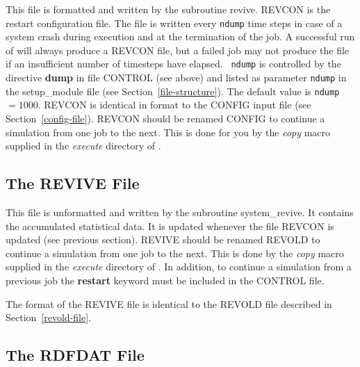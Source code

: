 This file is formatted and written by the subroutine {\sc revive}.
REVCON is the restart configuration file.  The file is written every
{\tt ndump} time steps in case of a system crash during execution
and at the termination of the job.  A successful run of \D will
always produce a REVCON file, but a failed job may not produce the
file if an insufficient number of timesteps have elapsed.  {\tt
ndump} is controlled by the directive {\bf dump} in file CONTROL
(see above) and listed as parameter {\tt ndump} in the {\sc
setup\_module} file (see Section~\ref{file-structure}). The default
value is {\tt ndump} $=1000$.  REVCON is identical in format to the
CONFIG input file (see Section~\ref{config-file}).  REVCON should be
renamed CONFIG to continue a simulation from one job to the next.
This is done for you by the {\sl copy} macro supplied in the {\em
execute} directory of \D.

\subsection{The REVIVE File}
\label{revive-file}

This file is unformatted and written by the subroutine {\sc
system\_revive}.  It contains the accumulated statistical data. It
is updated whenever the file REVCON is updated (see previous
section).  REVIVE should be renamed REVOLD to continue a
simulation from one job to the next.  This is done by the {\sl
copy} macro supplied in the {\em execute} directory of \D.  In
addition, to continue a simulation from a previous job the {\bf
restart} keyword must be included in the CONTROL file.

The format of the REVIVE file is identical to the REVOLD file
described in Section~\ref{revold-file}.

\subsection{The RDFDAT File}
\label{rdf-file}


